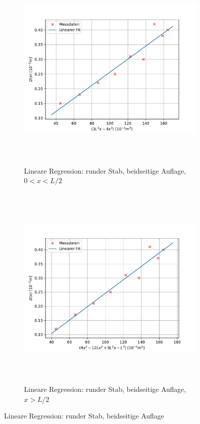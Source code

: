 \begin{figure}[H]
  \begin{subfigure}{\textwidth}
  \centering
  \includegraphics[height=10cm]{content/plots/rundb1.pdf}
  \caption{Lineare Regression: runder Stab, beidseitige Auflage, $0<x<L/2$}
  \label{fig:LinRegrundb1}
  \end{subfigure}
  \hfill
  \begin{subfigure}{\textwidth}
  \centering
  \includegraphics[height=10cm]{content/plots/rundb2.pdf}
  \caption{Lineare Regression: runder Stab, beidseitige Auflage, $x>L/2$}
  \label{fig:LinRegrundb2}
  \end{subfigure}
  \caption{Lineare Regression: runder Stab, beidseitige Auflage}
  \label{fig:LinRegrundb}
\end{figure}



